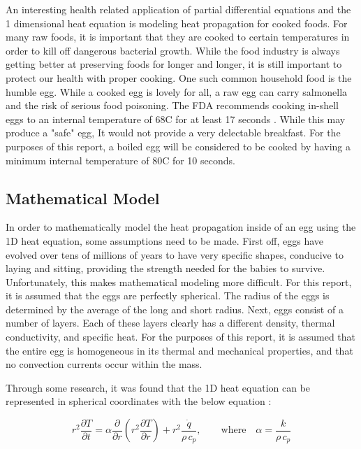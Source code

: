 \documentclass[12pt]{article}
\begin{document}
An interesting health related application of partial differential equations and the 1 dimensional heat equation is modeling heat propagation for cooked foods. For many raw foods, it is important that they are cooked to certain temperatures in order to kill off dangerous bacterial growth. While the food industry is always getting better at preserving foods for longer and longer, it is still important to protect our health with proper cooking. One such common household food is the humble egg. While a cooked egg is lovely for all, a raw egg can carry salmonella and the risk of serious food poisoning. The FDA recommends cooking in-shell eggs to an internal temperature of 68\textdegree C for at least 17 seconds \cite{fda_egg_cook}. While this may produce a "safe" egg, It would not provide a very delectable breakfast. For the purposes of this report, a boiled egg will be considered to be cooked by having a minimum internal temperature of 80\textdegree C for 10 seconds.  

\subsection{Mathematical Model}

In order to mathematically model the heat propagation inside of an egg using the 1D heat equation, some assumptions need to be made. First off, eggs have evolved over tens of millions of years to have very specific shapes, conducive to laying and sitting, providing the strength needed for the babies to survive. Unfortunately, this makes mathematical modeling more difficult. For this report, it is assumed that the eggs are perfectly spherical. The radius of the eggs is determined by the average of the long and short radius. Next, eggs consist of a number of layers. Each of these layers clearly has a different density, thermal conductivity, and specific heat. For the purposes of this report, it is assumed that the entire egg is homogeneous in its thermal and mechanical properties, and that no convection currents occur within the mass.

Through some research, it was found that the 1D heat equation can be represented in spherical coordinates with the below equation \cite{spherical_math}:

\begin{equation}
    \label{eqn:q1_1d_spherical_heat}
    r^2 \frac{\partial T}{\partial t} = \alpha \frac{\partial}{\partial r} \left( r^2 \frac{\partial T}{\partial r} \right) + r^2 \frac{\dot q}{\rho \, c_p} , \qquad \text{where} \quad \alpha = \frac{k}{\rho \, c_p}
\end{equation}
\end{document}
